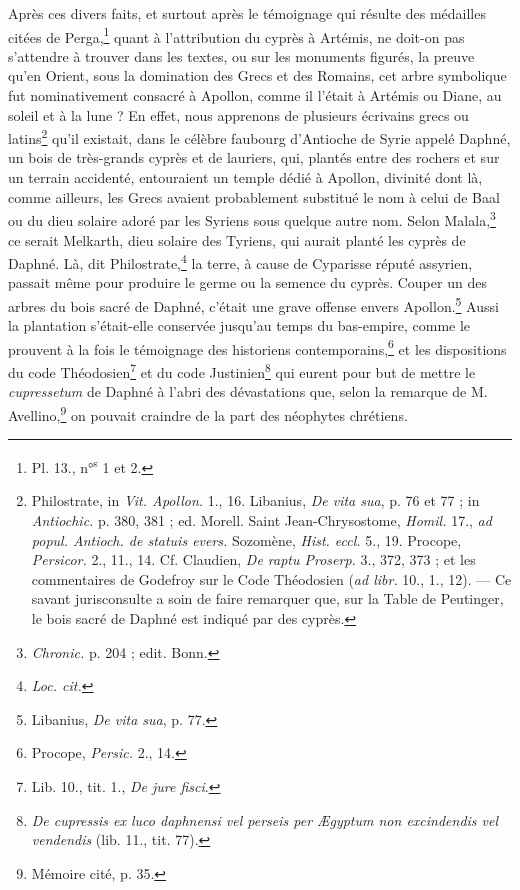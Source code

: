 \documentclass{article}
\begin{document}
Après ces divers faits, et surtout après le témoignage qui résulte des médailles citées de Perga,\footnote{Pl. 13., n°\textsuperscript{s} 1 et 2.} quant à l'attribution du cyprès à Artémis, ne doit-on pas s'attendre à trouver dans les textes, ou sur les monuments figurés, la preuve qu'en Orient, sous la domination des Grecs et des Romains, cet arbre symbolique fut nominativement consacré à Apollon, comme il l'était à Artémis ou Diane, au soleil et à la lune ? En effet, nous apprenons de plusieurs écrivains grecs ou latins\footnote{Philostrate, in \emph{Vit. Apollon.} 1., 16. Libanius, \emph{De vita sua}, p. 76 et 77 ; in \emph{Antiochic.} p. 380, 381 ; ed. Morell. Saint Jean-Chrysostome, \emph{Homil.} 17., \emph{ad popul. Antioch. de statuis evers.} Sozomène, \emph{Hist. eccl.} 5., 19. Procope, \emph{Persicor.} 2., 11., 14. Cf. Claudien, \emph{De raptu Proserp.} 3., 372, 373 ; et les commentaires de Godefroy sur le Code Théodosien (\emph{ad libr.} 10., 1., 12). --- Ce savant jurisconsulte a soin de faire remarquer que, sur la Table de Peutinger, le bois sacré de Daphné est indiqué par des cyprès.} qu'il existait, dans le célèbre faubourg d'Antioche de Syrie appelé Daphné, un bois de très-grands cyprès et de lauriers, qui, plantés entre des rochers et sur un terrain accidenté, entouraient un temple dédié à Apollon, divinité dont là, comme ailleurs, les Grecs avaient probablement substitué le nom à celui de Baal ou du dieu solaire adoré par les Syriens sous quelque autre nom. Selon Malala,\footnote{\emph{Chronic.} p. 204 ; edit. Bonn.} ce serait Melkarth, dieu solaire des Tyriens, qui aurait planté les cyprès de Daphné. Là, dit Philostrate,\footnote{\emph{Loc. cit.}} la terre, à cause de Cyparisse réputé assyrien, passait même pour produire le germe ou la semence du cyprès. Couper un des arbres du bois sacré de Daphné, c'était une grave offense envers Apollon.\footnote{Libanius, \emph{De vita sua}, p. 77.} Aussi la plantation s'était-elle conservée jusqu'au temps du bas-empire, comme le prouvent à la fois le témoignage des historiens contemporains,\footnote{Procope, \emph{Persic.} 2., 14.} et les dispositions du code Théodosien\footnote{Lib. 10., tit. 1., \emph{De jure fisci}.} et du code Justinien\footnote{\emph{De cupressis ex luco daphnensi vel perseis per Ægyptum non excindendis vel vendendis} (lib. 11., tit. 77).} qui eurent pour but de mettre le \emph{cupressetum} de Daphné à l'abri des dévastations que, selon la remarque de M. Avellino,\footnote{Mémoire cité, p. 35.} on pouvait craindre de la part des néophytes chrétiens.
\end{document}
